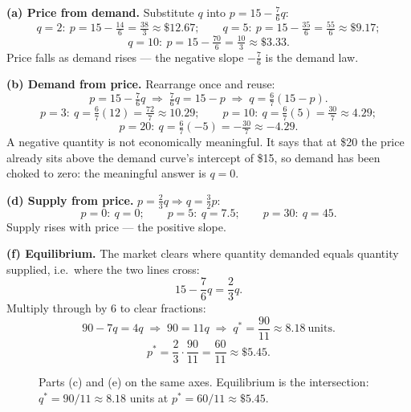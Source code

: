 \begin{solution}
\textbf{(a) Price from demand.} Substitute $q$ into $p=15-\tfrac76 q$:
\[
q=2:\ p=15-\tfrac{14}{6}=\tfrac{38}{3}\approx\$12.67;\qquad
q=5:\ p=15-\tfrac{35}{6}=\tfrac{55}{6}\approx\$9.17;
\]
\[
q=10:\ p=15-\tfrac{70}{6}=\tfrac{10}{3}\approx\$3.33 .
\]
Price falls as demand rises --- the negative slope $-\tfrac76$ is the demand
law.

\medskip
\textbf{(b) Demand from price.} Rearrange once and reuse:
\[
p=15-\tfrac76 q \;\Longrightarrow\; \tfrac76 q=15-p \;\Longrightarrow\;
q=\tfrac67(15-p).
\]
\[
p=3:\ q=\tfrac67(12)=\tfrac{72}{7}\approx 10.29;\qquad
p=10:\ q=\tfrac67(5)=\tfrac{30}{7}\approx 4.29;
\]
\[
p=20:\ q=\tfrac67(-5)=-\tfrac{30}{7}\approx -4.29 .
\]
A negative quantity is not economically meaningful. It says that at \$20 the
price already sits above the demand curve's intercept of \$15, so demand has
been choked to zero: the meaningful answer is $q=0$.

\medskip
\textbf{(d) Supply from price.} $p=\tfrac23 q \Rightarrow q=\tfrac32 p$:
\[
p=0:\ q=0;\qquad p=5:\ q=7.5;\qquad p=30:\ q=45 .
\]
Supply rises with price --- the positive slope.

\medskip
\textbf{(f) Equilibrium.} The market clears where quantity demanded equals
quantity supplied, i.e.\ where the two lines cross:
\[
15-\frac76 q=\frac23 q .
\]
Multiply through by 6 to clear fractions:
\[
90-7q=4q \;\Longrightarrow\; 90=11q \;\Longrightarrow\;
q^{*}=\frac{90}{11}\approx 8.18 \ \text{units}.
\]
\[
p^{*}=\frac23\cdot\frac{90}{11}=\frac{60}{11}\approx \$5.45 .
\]

\begin{figure}[H]
\centering
{}
\caption{Parts (c) and (e) on the same axes. Equilibrium is the intersection:
$q^{*}=90/11\approx 8.18$ units at $p^{*}=60/11\approx\$5.45$.}
\end{figure}


\end{solution}
